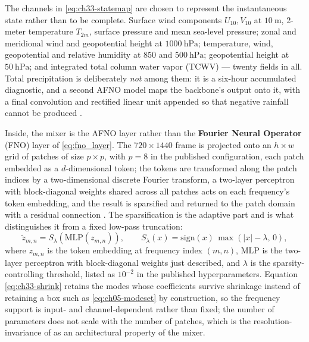 The channels in \eqref{eq:ch33-statemap} are chosen to represent the instantaneous state
rather than to be complete. Surface wind components $U_{10}, V_{10}$ at $10\ \mathrm{m}$,
2-meter temperature $T_{2m}$, surface pressure and mean sea-level pressure; zonal and
meridional wind and geopotential height at $1000\ \mathrm{hPa}$; temperature, wind,
geopotential and relative humidity at $850$ and $500\ \mathrm{hPa}$; geopotential height at
$50\ \mathrm{hPa}$; and integrated total column water vapor (TCWV) --- twenty fields in
all. Total precipitation is deliberately \emph{not} among them: it is a six-hour
accumulated diagnostic, and a second AFNO model maps the backbone's output onto it, with a
final convolution and rectified linear unit appended so that negative rainfall cannot be
produced \cite{pathak2022fourcastnet}.

Inside, the mixer is the AFNO layer rather than the \textbf{Fourier Neural Operator} (FNO)
layer of \eqref{eq:fno_layer}. The $720 \times 1440$ frame is projected onto an $h \times w$
grid of patches of size $p \times p$, with $p = 8$ in the published configuration, each patch
embedded as a $d$-dimensional token; the
tokens are transformed along the patch indices by a two-dimensional discrete Fourier
transform, a two-layer perceptron with block-diagonal weights shared across all patches acts
on each frequency's token embedding, and the result is sparsified and returned to the patch
domain with a residual connection \cite{pathak2022fourcastnet,guibas2021afno}. The sparsification is the
adaptive part and is what distinguishes it from a fixed low-pass truncation:
\begin{equation}
  \label{eq:ch33-shrink}
  \tilde{z}_{m,n} = S_\lambda\!\left(\mathrm{MLP}\left(z_{m,n}\right)\right),
  \qquad
  S_\lambda(x) = \mathrm{sign}(x)\,\max\!\left(|x| - \lambda,\, 0\right),
\end{equation}
where $z_{m,n}$ is the token embedding at frequency index $(m,n)$, $\mathrm{MLP}$ is the
two-layer perceptron with block-diagonal weights just described, and $\lambda$ is the
sparsity-controlling threshold, listed as $10^{-2}$ in the published hyperparameters. Equation
\eqref{eq:ch33-shrink} retains the modes whose coefficients survive
shrinkage instead of retaining a box such as \eqref{eq:ch05-modeset} by construction, so
the frequency support is input- and channel-dependent rather than fixed; the number of
parameters does not scale with the number of patches, which is the resolution-invariance of
 as an architectural property
of the mixer. 

